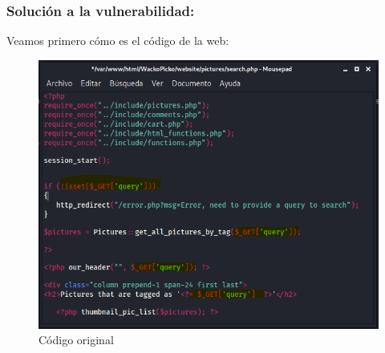 \documentclass[12pt,twoside]{article}
\begin{document}
\subsubsection*{Solución a  la vulnerabilidad:}
Veamos primero cómo es el código de la web:
\begin{figure}[H]
    \centering
    \includegraphics[scale=0.5]{./imagenes/search_sin_sanitizar}
    \caption{Código original}
\end{figure}
\end{document}
